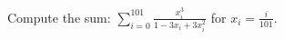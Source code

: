 Compute the sum: $\displaystyle\sum_{i=0}^{101} \frac{x_i^3}{1-3x_i+3x_i^2}$ for $x_i=\frac{i}{101}$.